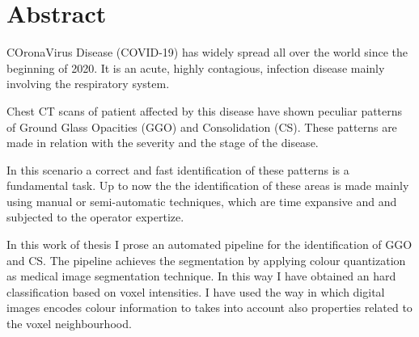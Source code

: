 \documentclass{standalone}
\begin{document}
	\chapter*{Abstract}
	
	COronaVirus Disease (COVID-19) has widely spread all over the world since the beginning of 2020. It is an acute, highly contagious, infection disease mainly involving the respiratory system. 
	
	Chest CT scans of patient affected by this disease have shown peculiar patterns of Ground Glass Opacities (GGO) and Consolidation (CS). These patterns are made in relation with the severity and the stage of the disease. 
	
	In this scenario a correct and fast identification of these patterns is a fundamental task.  Up to now the the identification of these areas is made mainly using manual or semi-automatic techniques, which are time expansive and and subjected to the operator expertize. 
	
	In this work of thesis I prose an automated pipeline for the identification of GGO and CS. The pipeline achieves the segmentation by applying colour quantization as medical image segmentation technique. In this way I have obtained an hard classification based on voxel intensities. I have used the way in which digital images encodes colour information to takes into account also properties related to the voxel neighbourhood.
\end{document}
